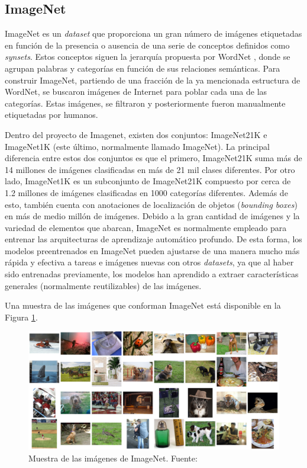 \subsection{ImageNet}
ImageNet \cite{imagenet_cvpr09, ILSVRC15} es un \textit{dataset} que proporciona un gran número de imágenes etiquetadas en función de la presencia o ausencia de una serie de conceptos definidos como \textit{synsets}. Estos conceptos siguen la jerarquía propuesta por WordNet \cite{wordnet}, donde se agrupan palabras y categorías en función de sus relaciones semánticas. Para construir ImageNet, partiendo de una fracción de la ya mencionada estructura de WordNet, se buscaron imágenes de Internet para poblar cada una de las categorías. Estas imágenes, se filtraron y posteriormente fueron manualmente etiquetadas por humanos. 

Dentro del proyecto de Imagenet, existen dos conjuntos: ImageNet21K e ImageNet1K (este último, normalmente llamado ImageNet). La principal diferencia entre estos dos conjuntos es que el primero, ImageNet21K suma más de 14 millones de imágenes clasificadas en más de 21 mil clases diferentes. Por otro lado, ImageNet1K es un subconjunto de ImageNet21K compuesto por cerca de 1.2 millones de imágenes clasificadas en 1000 categorías diferentes. Además de esto, también cuenta con anotaciones de localización de objetos (\textit{bounding boxes}) en más de medio millón de imágenes. Debido a la gran cantidad de imágenes y la variedad de elementos que abarcan, ImageNet es normalmente empleado para entrenar las arquitecturas de aprendizaje automático profundo. De esta forma, los modelos preentrenados en ImageNet pueden ajustarse de una manera mucho más rápida y efectiva a tareas e imágenes nuevas con otros \textit{datasets}, ya que al haber sido entrenadas previamente, los modelos han aprendido a extraer características generales (normalmente reutilizables) de las imágenes.

Una muestra de las imágenes que conforman ImageNet está disponible en la Figura \ref{fig:imagenet}.
\begin{figure}[H]
\centering
\includegraphics[width=\textwidth]{imagenes/imagenet.png}
\caption{Muestra de las imágenes de ImageNet. Fuente: \cite{ILSVRC15}}
\label{fig:imagenet}
\end{figure}

